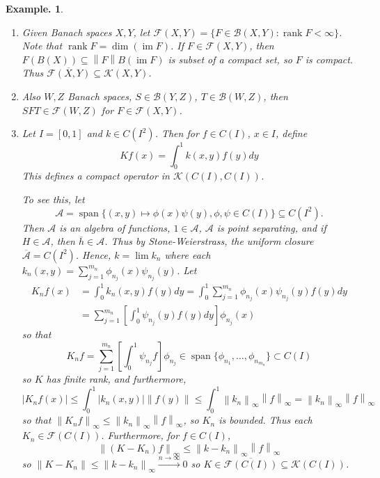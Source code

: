 \documentclass[11pt, a4paper]{memoir}
\newcommand{\norm}[1]{\ensuremath{\left\lVert#1\right\rVert}}
\newcommand{\fto}[1]{\ensuremath{\xrightarrow{\scriptstyle{#1}}}}
\theoremstyle{change}
\theoremstyle{plain}
\theoremstyle{nonumberplain}
\newtheorem{example}{Example.}
\DeclareMathOperator{\im}{im}
\DeclareMathOperator{\rank}{rank}
\DeclareMathOperator{\spn}{span}
\numberwithin{equation}{section}
\begin{document}
\begin{example}
    \begin{enumerate}[nl,r]
        \item Given Banach spaces $X,Y$, let $\mathcal{F}(X,Y)=\{F\in\mathcal{B}(X,Y):\rank F<\infty\}$.
            Note that $\rank F=\dim(\im F)$.
            If $F\in\mathcal{F}(X,Y)$, then $F(B(X))\subseteq\norm{F}B(\im F)$ is subset of a compact set, so $F$ is compact.
            Thus $\overline{\mathcal{F}(X,Y)}\subseteq\mathcal{K}(X,Y)$.
        \item Also $W,Z$ Banach spaces, $S\in\mathcal{B}(Y,Z)$, $T\in\mathcal{B}(W,Z)$, then $SFT\in\mathcal{F}(W,Z)$ for $F\in\mathcal{F}(X,Y)$.
        \item Let $I=[0,1]$ and $k\in C(I^2)$.
            Then for $f\in C(I)$, $x\in I$, define
            \begin{equation*}
                Kf(x)=\int_0^1k(x,y)f(y)dy
            \end{equation*}
            This defines a compact operator in $\mathcal{K}(C(I),C(I))$.

            To see this, let
            \begin{equation*}
                \mathcal{A}=\spn\{(x,y)\mapsto\phi(x)\psi(y),\phi,\psi\in C(I)\}\subseteq C(I^2).
            \end{equation*}
            Then $\mathcal{A}$ is an algebra of functions, $1\in\mathcal{A}$, $\mathcal{A}$ is point separating, and if $H\in\mathcal{A}$, then $\overline{h}\in\mathcal{A}$.
            Thus by Stone-Weierstrass, the uniform closure $\overline{\mathcal{A}}=C(I^2)$.
            Hence, $k=\lim k_n$ where each $k_n(x,y)=\sum_{j=1}^{m_n}\phi_{n_j}(x)\psi_{n_j}(y)$.
            Let
            \begin{align*}
                K_nf(x)&=\int_0^1 k_n(x,y)f(y)dy=\int_0^1\sum_{j=1}^{m_n}\phi_{n_j}(x)\psi_{n_j}(y)f(y)dy\\
                       &= \sum_{j=1}^{m_n}\left[\int_0^1\psi_{n_j}(y)f(y)dy\right]\phi_{n_j}(x)
            \end{align*}
            so that
            \begin{equation*}
                K_nf=\sum_{j=1}^{m_n}\left[\int_0^1\psi_{n_j}f\right]\phi_{n_j}\in\spn\{\phi_{n_1},\ldots,\phi_{n_{m_n}}\}\subset C(I)
            \end{equation*}
            so $K$ has finite rank, and furthermore,
            \begin{equation*}
                |K_nf(x)|\leq\int_0^1|k_n(x,y)|\norm{f(y)}\leq\int_0^1\norm{k_n}_\infty\norm{f}_\infty=\norm{k_n}_\infty\norm{f}_\infty
            \end{equation*}
            so that $\norm{K_nf}_\infty\leq\norm{k_n}_\infty\norm{f}_\infty$, so $K_n$ is bounded.
            Thus each $K_n\in\mathcal{F}(C(I))$.
            Furthermore, for $f\in C(I)$,
            \begin{equation*}
                \norm{(K-K_n)f}_\infty\leq\norm{k-k_n}_\infty\norm{f}_\infty
            \end{equation*}
            so $\norm{K-K_n}\leq\norm{k-k_n}_\infty\fto{n\to\infty}0$ so $K\in\overline{\mathcal{F}(C(I))}\subseteq\mathcal{K}(C(I))$.


\end{enumerate}
\end{example}
\end{document}
